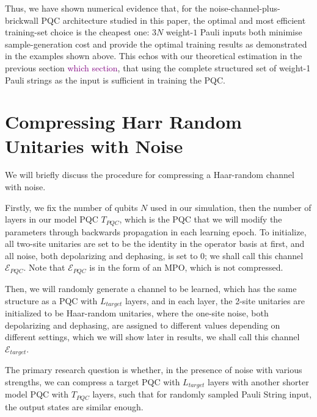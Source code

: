 \documentclass[%
 reprint,
superscriptaddress,
 amsmath,amssymb,
 aps,
]{revtex4-2}
\newcommand{\E}{\mathcal{E}}
\newcommand{\simba}[1]{\textcolor{purple}{#1}}
\begin{document}
Thus, we have shown numerical evidence that, for the noise-channel-plus-brickwall PQC architecture studied in this paper, the optimal and most efficient training-set choice is the cheapest one: $3N$ weight-$1$ Pauli inputs both minimise sample-generation cost and provide the optimal training results as demonstrated in the examples shown above. This echos with our theoretical estimation in the previous section \simba{which section}, that using the complete structured set of weight-1 Pauli strings as the input is sufficient in training the PQC.






\section{Compressing Harr Random Unitaries with Noise}
\label{sec:Numerical_result_Random_U}

We will briefly discuss the procedure for compressing a Haar-random channel with noise. 

Firstly, we fix the number of qubits $N$ used in our simulation, then the number of layers in our model PQC $T_{PQC}$, which is the PQC that we will modify the parameters through backwards propagation in each learning epoch. To initialize, all two-site unitaries are set to be the identity in the operator basis at first, and all noise, both depolarizing and dephasing, is set to 0; we shall call this channel $\E_{PQC}$. Note that $\E_{PQC}$ is in the form of an MPO, which is not compressed.

Then, we will randomly generate a channel to be learned, which has the same structure as a PQC with $L_{target}$ layers, and in each layer, the 2-site unitaries are initialized to be Haar-random unitaries, where the one-site noise, both depolarizing and dephasing, are assigned to different values depending on different settings, which we will show later in results, we shall call this channel $\E_{target}$.

The primary research question is whether, in the presence of noise with various strengths, we can compress a target PQC with $L_{target}$ layers with another shorter model PQC with $T_{PQC}$ layers, such that for randomly sampled Pauli String input, the output states are similar enough.
\end{document}
